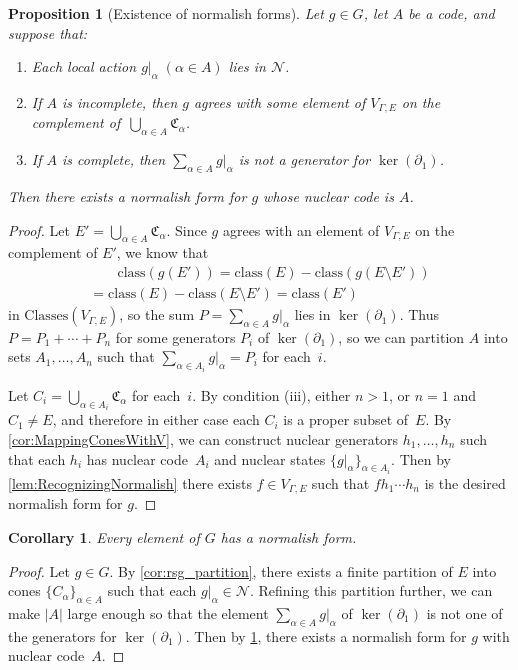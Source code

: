 \documentclass[11pt,letterpaper]{amsart}
\newtheorem{proposition}[theorem]{Proposition}
\newtheorem{corollary}[theorem]{Corollary}
\theoremstyle{definition}
\newcommand{\Nuc}{\mathcal{N}}
\newcommand{\C}{\mathfrak{C}}
\newcommand{\Classes}{\mathrm{Classes}}
\newcommand{\class}{\mathrm{class}}
\begin{document}
\begin{proposition}[Existence of normalish forms]\label{prop:NormalishFormsExist}
Let $g\in G$, let $A$ be a code, and suppose that:
\begin{enumerate}
    \item Each local action $g|_{\alpha}\;(\alpha\in A)$ lies in $\Nuc$.\smallskip
    \item If $A$ is incomplete, then $g$ agrees with some element of $V_{\Gamma,E}$ on the complement of\/~$\bigcup_{\alpha\in A} \C_{\alpha}$. \smallskip
    \item If $A$ is complete, then\/ $\sum_{\alpha\in A} g|_\alpha$ is not a generator for\/ $\ker(\partial_1)$.\smallskip
\end{enumerate}
Then there exists a normalish form for $g$ whose nuclear code is $A$.
\end{proposition}
\begin{proof}
Let $E'=\bigcup_{\alpha\in A} \C_\alpha$. Since $g$ agrees with an element of $V_{\Gamma,E}$ on the complement of $E'$, we know that
\begin{multline*}
\qquad \class(g(E'))=\class(E)-\class(g(E\setminus E')) \\ = \class(E)-\class(E\setminus E') = \class(E')\qquad
\end{multline*}
in $\Classes(V_{\Gamma,E})$, so the sum $P = \sum_{\alpha\in A} g|_\alpha$ lies in $\ker(\partial_1)$.  Thus $P=P_1+\cdots+ P_n$ for some generators $P_i$ of $\ker(\partial_1)$, so we can partition $A$ into sets $A_1,\ldots,A_n$ such that $\sum_{\alpha\in A_i} g|_{\alpha}=P_i$ for each~$i$. 

Let $C_i=\bigcup_{\alpha\in A_i} \C_{\alpha}$ for each~$i$.  By condition (iii), either $n>1$, or $n=1$ and $C_1\ne E$, and therefore in either case each $C_i$ is a proper subset of~$E$.  By \cref{cor:MappingConesWithV}, we can construct nuclear generators $h_1,\ldots,h_n$ such that each $h_i$ has nuclear code~$A_i$ and nuclear states $\{g|_{\alpha}\}_{\alpha\in A_i}$. Then by \cref{lem:RecognizingNormalish} there exists $f\in V_{\Gamma,E}$ such that $fh_1\cdots h_n$ is the desired normalish form for $g$.
\end{proof}

\begin{corollary}\label{cor:EveryElementNormalishForm}
Every element of $G$ has a normalish form.
\end{corollary}
\begin{proof}
Let $g\in G$.  By \cref{cor:rsg_partition}, there exists a finite partition of $E$ into cones $\{C_{\alpha}\}_{\alpha\in A}$ such that each $g|_\alpha\in \Nuc$.  Refining this partition further, we can make $|A|$ large enough so that the element $\sum_{\alpha\in A} g|_{\alpha}$ of $\ker(\partial_1)$ is not one of the generators for $\ker(\partial_1)$. Then by \cref{prop:NormalishFormsExist}, there exists a normalish form for $g$ with nuclear code~$A$.
\end{proof}
\end{document}
